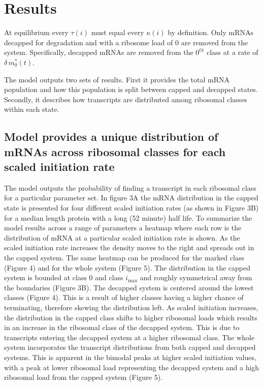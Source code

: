 \documentclass[review]{elsarticle}
\newcommand{\imax}{\ensuremath{i_{\max}}\xspace}
\begin{document}
\section{Results}



At equilibrium every $\tau(i)$ must equal every $\kappa(i)$ by definition.  
Only mRNAs decapped for degradation and with a ribosome load of 0 are removed from the system.
Specifically, decapped mRNAs are removed from the $0^{th}$ class at a rate of $\delta \, m^*_0(t)$.









The model outputs two sets of results. First it provides the total mRNA population and how this population is split between capped and decapped states. Secondly, it describes how transcripts are distributed among ribosomal classes within each state. 

\subsection{Model provides a unique distribution of mRNAs across ribosomal classes for each scaled initiation rate}

The model outputs the probability of finding a transcript in each ribosomal class for a particular parameter set. In figure 3A the mRNA distribution in the capped state is presented for four different scaled initiation rates (as shown in Figure 3B) for a median length protein with a long (52 minute) half life. To summarize the model results across a range of parameters a heatmap where each row is the distribution of mRNA at a particular scaled initiation rate is shown. As the scaled initiation rate increases the density moves to the right and spreads out in the capped system. The same heatmap can be produced for the marked class (Figure 4) and for the whole system (Figure 5). The distribution in the capped system is bounded at class 0 and class \imax and roughly symmetrical away from the boundaries (Figure 3B). The decapped system is centered around the lowest classes (Figure 4). This is a result of higher classes having a higher chance of terminating, therefore skewing the distribution left. As scaled initiation increases, the distribution in the capped class shifts to higher ribosomal loads which results in an increase in the ribosomal class of the decapped system. This is due to transcripts entering the decapped system at a higher ribosomal class. The whole system incorporates the transcript distributions from both capped and decapped systems. This is apparent in the bimodal peaks at higher scaled initiation values, with a peak at lower ribosomal load representing the decapped system and a high ribosomal load from the capped system (Figure 5).
\end{document}
